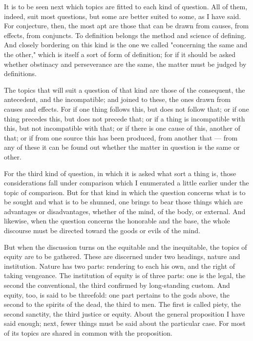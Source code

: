  It is to be seen next which topics are fitted to each kind of question. All of them, indeed, suit most questions, but some are better suited to some, as I have said. For conjecture, then, the most apt are those that can be drawn from causes, from effects, from conjuncts. To definition belongs the method and science of defining. And closely bordering on this kind is the one we called "concerning the same and the other," which is itself a sort of form of definition; for if it should be asked whether obstinacy and perseverance are the same, the matter must be judged by definitions.

 The topics that will suit a question of that kind are those of the consequent, the antecedent, and the incompatible; and joined to these, the ones drawn from causes and effects. For if one thing follows this, but does not follow that; or if one thing precedes this, but does not precede that; or if a thing is incompatible with this, but not incompatible with that; or if there is one cause of this, another of that; or if from one source this has been produced, from another that — from any of these it can be found out whether the matter in question is the same or other.

 For the third kind of question, in which it is asked what sort a thing is, those considerations fall under comparison which I enumerated a little earlier under the topic of comparison. But for that kind in which the question concerns what is to be sought and what is to be shunned, one brings to bear those things which are advantages or disadvantages, whether of the mind, of the body, or external. And likewise, when the question concerns the honorable and the base, the whole discourse must be directed toward the goods or evils of the mind.

 But when the discussion turns on the equitable and the inequitable, the topics of equity are to be gathered. These are discerned under two headings, nature and institution. Nature has two parts: rendering to each his own, and the right of taking vengeance. The institution of equity is of three parts: one is the legal, the second the conventional, the third confirmed by long-standing custom. And equity, too, is said to be threefold: one part pertains to the gods above, the second to the spirits of the dead, the third to men. The first is called piety, the second sanctity, the third justice or equity. About the general proposition I have said enough; next, fewer things must be said about the particular case. For most of its topics are shared in common with the proposition.

